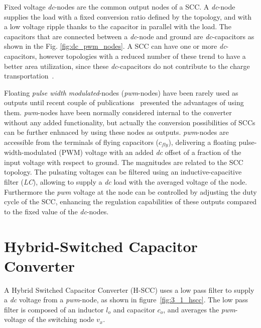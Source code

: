 Fixed voltage \emph{dc}-nodes are the common output nodes of a SCC. A \emph{dc}-node supplies the load with a fixed conversion ratio defined by the topology, and  with a low voltage ripple thanks to the capacitor in parallel with the load. The capacitors that are connected between a \emph{dc}-node and ground are  \emph{dc}-capacitors as shown in the Fig. \ref{fig:dc_pwm_nodes}. A SCC can have one or more \emph{dc}-capacitors, however topologies with a reduced number of these trend to have a better area utilization, since these \emph{dc}-capacitors do not contribute to the charge transportation~\cite{Seeman:EECS-2009-78}.

Floating \emph{pulse width modulated}-nodes (\emph{pwm}-nodes) have been rarely used as outputs until recent couple of publications~\cite{2012Kumar, 2012Kline} presented the advantages of using them. \emph{pwm}-nodes have been normally considered  internal to the converter without any added functionality, but actually the conversion possibilities of SCCs can be further enhnaced by using these nodes as outputs.
\emph{pwm}-nodes are accessible from the terminals of flying capacitors ($c_{fly}$), delivering a floating pulse-width-modulated (PWM) voltage with an added \emph{dc} offset of a fraction of the input voltage with respect to ground. The magnitudes are related to the SCC topology. The pulsating voltages can be filtered using an inductive-capacitive filter (\emph{LC}), allowing to supply a \emph{dc} load with the averaged voltage of the node. Furthermore the \emph{pwm} voltage at the node can be controlled by adjusting the duty
cycle of the SCC, enhancing the regulation capabilities of these outputs compared to the fixed value of the \emph{dc}-nodes.

\section{Hybrid-Switched Capacitor Converter}
A Hybrid Switched Capacitor Converter (H-SCC) uses a low pass filter to supply a \emph{dc} voltage from a \emph{pwm}-node, as shown in figure~\ref{fig:3_1_hscc}. The low pass filter is composed of an inductor $l_o$ and capacitor $c_o$, and averages the \emph{pwm}-voltage of the switching node $v_x$.

